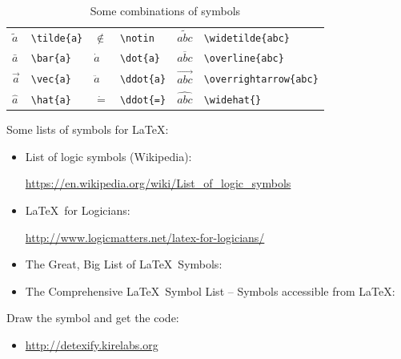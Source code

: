 \begin{frame}

\begin{table}

\centering
\begin{tabular}{ll|ll|ll}

$\tilde{a}$&	\texttt{\textbackslash tilde\{a\}}	&$\notin$	&	\texttt{\textbackslash notin}	&$\widetilde{abc}$	&	\texttt{\textbackslash widetilde\{abc\}}	\\
$\bar{a}$ &	\texttt{\textbackslash bar\{a\}}	&$\dot{a}$	&	\texttt{\textbackslash dot\{a\}}	&$\overline{abc}$	&	\texttt{\textbackslash overline\{abc\}}	\\
$\vec{a}$&	\texttt{\textbackslash vec\{a\}}	&$\ddot{a}$	&	\texttt{\textbackslash ddot\{a\}}	&$\overrightarrow{abc}$	&	\texttt{\textbackslash overrightarrow\{abc\}}	\\
$\hat{a}$&	\texttt{\textbackslash hat\{a\}}	&$\dot{=}$	&	\texttt{\textbackslash ddot\{=\}}	&$\widehat{abc}$	&	\texttt{\textbackslash widehat\{\}}
\end{tabular}
\caption{Some combinations of symbols}
\end{table}


\end{frame}


\begin{frame}

Some lists of symbols for \LaTeX :

\begin{itemize}
\item List of logic symbols (Wikipedia): 

\url{https://en.wikipedia.org/wiki/List_of_logic_symbols}

\item \LaTeX\ for Logicians:

\url{http://www.logicmatters.net/latex-for-logicians/}

\item The Great, Big List of \LaTeX\ Symbols: \citet{Carlisle&Co01a}

\item The Comprehensive \LaTeX\ Symbol List -- Symbols accessible from \LaTeX :  \citet{Pakin17a}
\end{itemize}

\bigskip

Draw the symbol and get the code:

\begin{itemize}
\item \url{http://detexify.kirelabs.org}
\end{itemize}
\end{frame}


